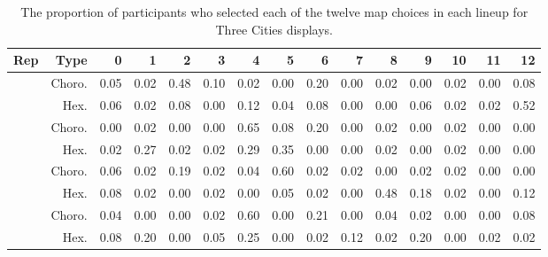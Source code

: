 \documentclass{monashthesis}
\begin{document}
\begin{table}

\caption{\label{tab:choice-three}The proportion of participants who selected each of the twelve map choices in each lineup for Three Cities displays.}
\centering
\begin{tabular}[t]{rrrrrrrrrrrrrrr}
\toprule
Rep & Type & 0 & 1 & 2 & 3 & 4 & 5 & 6 & 7 & 8 & 9 & 10 & 11 & 12\\
\midrule
 & Choro. & 0.05 & 0.02 & 0.48 & 0.10 & 0.02 & 0.00 & 0.20 & 0.00 & 0.02 & 0.00 & 0.02 & 0.00 & 0.08\\
\cmidrule{2-15}
\multirow{-2}{*}{\raggedleft\arraybackslash 1} & Hex. & 0.06 & 0.02 & 0.08 & 0.00 & 0.12 & 0.04 & 0.08 & 0.00 & 0.00 & 0.06 & 0.02 & 0.02 & 0.52\\
\cmidrule{1-15}
 & Choro. & 0.00 & 0.02 & 0.00 & 0.00 & 0.65 & 0.08 & 0.20 & 0.00 & 0.02 & 0.00 & 0.02 & 0.00 & 0.00\\
\cmidrule{2-15}
\multirow{-2}{*}{\raggedleft\arraybackslash 2} & Hex. & 0.02 & 0.27 & 0.02 & 0.02 & 0.29 & 0.35 & 0.00 & 0.00 & 0.02 & 0.00 & 0.02 & 0.00 & 0.00\\
\cmidrule{1-15}
 & Choro. & 0.06 & 0.02 & 0.19 & 0.02 & 0.04 & 0.60 & 0.02 & 0.02 & 0.00 & 0.02 & 0.02 & 0.00 & 0.00\\
\cmidrule{2-15}
\multirow{-2}{*}{\raggedleft\arraybackslash 3} & Hex. & 0.08 & 0.02 & 0.00 & 0.02 & 0.00 & 0.05 & 0.02 & 0.00 & 0.48 & 0.18 & 0.02 & 0.00 & 0.12\\
\cmidrule{1-15}
 & Choro. & 0.04 & 0.00 & 0.00 & 0.02 & 0.60 & 0.00 & 0.21 & 0.00 & 0.04 & 0.02 & 0.00 & 0.00 & 0.08\\
\cmidrule{2-15}
\multirow{-2}{*}{\raggedleft\arraybackslash 4} & Hex. & 0.08 & 0.20 & 0.00 & 0.05 & 0.25 & 0.00 & 0.02 & 0.12 & 0.02 & 0.20 & 0.00 & 0.02 & 0.02\\
\bottomrule
\end{tabular}
\end{table}
\end{document}
